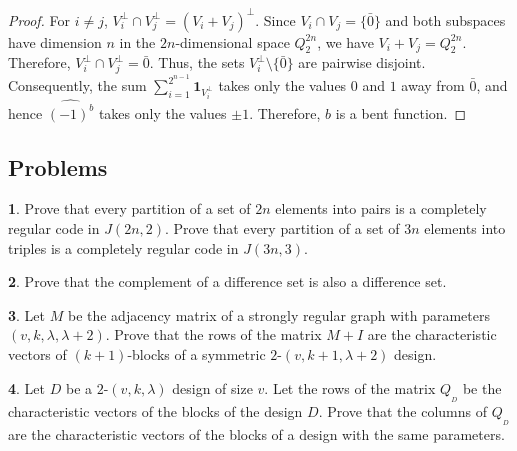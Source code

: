 \documentclass[11pt]{article}
\theoremstyle{definition}
\newtheorem{exercise}{\quad}
\begin{document}
{{{\begin{proof}
For $i\ne j$,
$
V_i^\perp\cap V_j^\perp=(V_i+V_j)^\perp.
$
Since
$
V_i\cap V_j=\{\bar 0\}
$
and both subspaces have dimension $n$ in the $2n$-dimensional space $Q_2^{2n}$, we have
$V_i+V_j=Q_2^{2n}$.
Therefore,
$
V_i^\perp\cap V_j^\perp={\bar 0}$.
Thus, the sets $V_i^\perp\setminus\{\bar 0\}$ are pairwise disjoint. Consequently, the sum
$\sum_{i=1}^{2^{n-1}}{\mathbf 1}_{V_i^\perp}$
takes only the values $0$ and $1$ away from $\bar 0$, and hence $\widehat{(-1)^b}$ takes only the values $\pm 1$. Therefore, $b$ is a bent function.
\end{proof}












\subsection{Problems}

\begin{exercise}
Prove that every partition of a set of $2n$ elements  into pairs  is a completely regular code in $J(2n,2)$.
Prove that every  partition of a set of $3n$ elements into triples is a completely regular code in $J(3n,3)$.
\end{exercise}



\begin{exercise}
Prove that the complement of a difference set is also a
difference set.
\end{exercise}

\begin{exercise}
Let $M$ be the adjacency matrix of a strongly regular graph with
parameters $(v,k,\lambda, \lambda+2)$. Prove that the rows of the matrix
$M+I$ are the characteristic
vectors of $(k+1)$-blocks of a symmetric $2$-$(v,k+1,\lambda+2)$
design.
\end{exercise}

\begin{exercise}
Let $D$ be a  $2$-$(v,k,\lambda)$ design
of size $v$. Let the rows of the matrix $Q_{_D}$ be the
characteristic vectors of the blocks of the design $D$. Prove that
the columns of $Q_{_D}$ are the characteristic vectors of the blocks of a
design with the same parameters.
\end{exercise}






}}}
\end{document}
